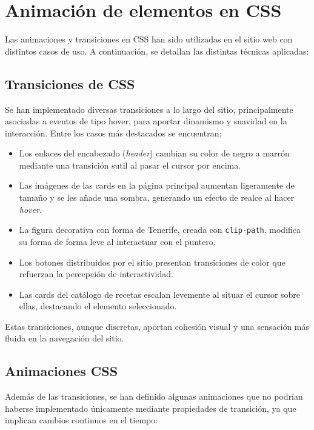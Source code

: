\documentclass{article}
\begin{document}
\section{Animación de elementos en CSS}\label{sec:animacion-de-elementos-en-css}

Las animaciones y transiciones en CSS han sido utilizadas en el sitio web con distintos casos de uso. A continuación, se detallan las distintas técnicas aplicadas:

\subsection{Transiciones de CSS}\label{subsec:transiciones-de-css}

Se han implementado diversas transiciones a lo largo del sitio, principalmente asociadas a eventos de tipo hover, para aportar dinamismo y suavidad en la interacción. Entre los casos más destacados se encuentran:

\begin{itemize}
    \item Los enlaces del encabezado (\textit{header}) cambian su color de negro a marrón mediante una transición sutil al pasar el cursor por encima.
    \item Las imágenes de las cards en la página principal aumentan ligeramente de tamaño y se les añade una sombra, generando un efecto de realce al hacer \textit{hover}.
    \item La figura decorativa con forma de Tenerife, creada con \texttt{clip-path}, modifica su forma de forma leve al interactuar con el puntero.
    \item Los botones distribuidos por el sitio presentan transiciones de color que refuerzan la percepción de interactividad.
    \item Las cards del catálogo de recetas escalan levemente al situar el cursor sobre ellas, destacando el elemento seleccionado.
\end{itemize}

Estas transiciones, aunque discretas, aportan cohesión visual y una sensación más fluida en la navegación del sitio.

\subsection{Animaciones CSS}\label{subsec:animaciones-css}

Además de las transiciones, se han definido algunas animaciones que no podrían haberse implementado únicamente mediante propiedades de transición, ya que implican cambios continuos en el tiempo:
\end{document}
